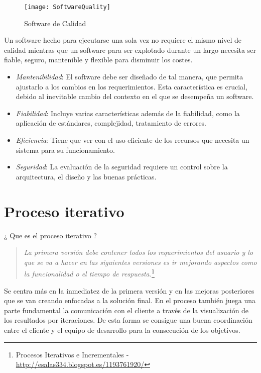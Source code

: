 \begin{figure}[H]
    \begin{center}	
        \texttt{[image: SoftwareQuality]}
        \caption{Software de Calidad}
        \label{fig:softwarequality}
    \end{center}
\end{figure}

\par Un software hecho para ejecutarse una sola vez no requiere el mismo nivel de calidad mientras que un software para ser explotado durante un largo necesita ser fiable, seguro, mantenible y flexible para disminuir los costes.

\begin{itemize}
	\item \emph{Mantenibilidad}: El software debe ser diseñado de tal manera, que permita ajustarlo a los cambios en los requerimientos. Esta característica es crucial, debido al inevitable cambio del contexto en el que se desempeña un software.
	\item \emph{Fiabilidad}: Incluye varias características además de la fiabilidad, como la aplicación de estándares, complejidad, tratamiento de errores.
	\item \emph{Eficiencia}: Tiene que ver con el uso eficiente de los recursos que necesita un sistema para su funcionamiento.
	\item \emph{Seguridad}: La evaluación de la seguridad requiere un control sobre la arquitectura, el diseño y las buenas prácticas.
\end{itemize}


\section{Proceso iterativo}
\label{sec:proc-iterativo}

\par ¿ Que es el proceso iterativo ?

\begin{quote}
    \emph{La primera versión debe contener todos los requerimientos del usuario y lo que se va a hacer en las siguientes versiones es ir mejorando aspectos como la funcionalidad o el tiempo de respuesta.}\footnote{Procesos Iterativos e Incrementales - \url{http://esalas334.blogspot.es/1193761920/}}
\end{quote}

\par Se centra más en la inmediatez de la primera versión y en las mejoras posteriores que se van creando enfocadas a la solución final. En el proceso también juega una parte fundamental la comunicación con el cliente a través de la visualización de los resultados por iteraciones. De esta forma se consigue una buena coordinación entre el cliente y el equipo de desarrollo para la consecución de los objetivos.

